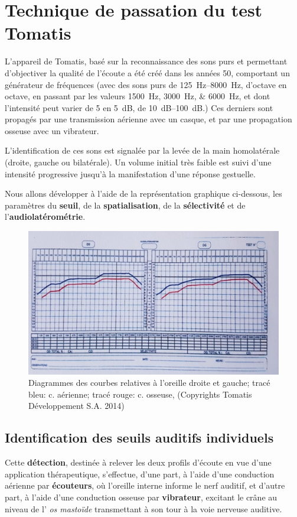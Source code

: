 \section{Technique de passation du test Tomatis}
L'appareil de Tomatis, basé sur la reconnaissance des sons purs et
permettant d'objectiver la qualité de l'écoute
 a été créé dans les années 50, comportant un générateur de fréquences
 (avec
 des sons
  purs de \SIrange{125}{8000}{\Hz}, d'octave en octave, en passant par les valeurs
\SIlist{1500;3000;6000}{\Hz}, et dont l'intensité peut varier de 5 en \SI{5}{\dB}, de \SIrange{10}{100}{\dB}.)
Ces derniers sont propagés par une
  transmission aérienne avec un casque, et par une propagation osseuse
  avec un vibrateur.

  L'identification de ces sons est 
  signalée par la levée de la main homolatérale (droite, gauche ou
  bilatérale).
Un volume initial très faible est suivi d'une intensité
progressive jusqu'à la manifestation d'une réponse gestuelle.
 
Nous allons développer à l'aide de la représentation
graphique ci-dessous,  les paramètres du\textbf{ seuil}, de la
\textbf{spatialisation}, de la \textbf{sélectivité} et de l'\textbf{audiolatérométrie}.


\begin{figure}
	\centering
	\includegraphics[width=0.7\linewidth]{images/courbeideale.jpg}
	\caption{Diagrammes des courbes relatives à l'oreille droite et
          gauche; tracé bleu: c. aérienne; tracé rouge: c.
          osseuse, (Copyrights Tomatis Développement S.A.  2014) }
	\label{fig:courbeideale}
\end{figure}




\subsection{Identification des seuils auditifs individuels}

Cette \textbf{détection}, destinée à relever les deux profils d'écoute
en vue d'une application thérapeutique, 
s'effectue, d'une part, à l'aide d'une
conduction aérienne par \textbf{écouteurs}, où l'oreille interne
informe le nerf auditif,  et d'autre part, à l'aide
d'une conduction osseuse par\textbf{ vibrateur}, excitant le crâne au
niveau de l'
\textit{os mastoïde} transmettant à son tour à  la voie nerveuse
auditive.

